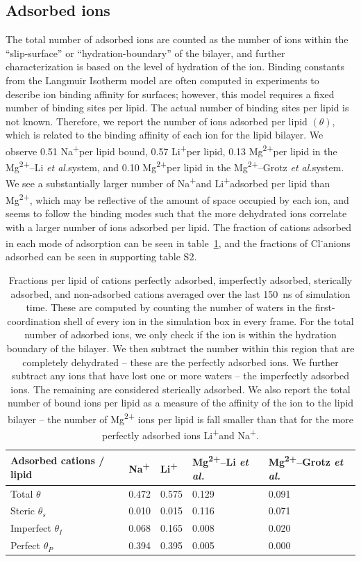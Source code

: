 \documentclass[12pt,openany,final]{book}
\newcommand{\etal}{\textit{et al.}}
\newcommand{\na}{Na\textsuperscript{+}}
\newcommand{\li}{Li\textsuperscript{+}}
\newcommand{\mg}{Mg\textsuperscript{2+}}
\newcommand{\cl}{Cl\textsuperscript{-}}
\newcommand{\mgmbnbfix}{Mg\textsuperscript{2+}--Li \etal} %
\newcommand{\mgmicro}{Mg\textsuperscript{2+}--Grotz \etal}
\begin{document}
\subsection{Adsorbed ions}
\label{sec:boundions}
The total number of adsorbed ions are counted as the number of ions within the ``slip-surface'' or ``hydration-boundary'' of the bilayer, and
further characterization is based on the level of hydration of the ion.
Binding constants from the Langmuir Isotherm model are often computed in experiments to describe ion binding affinity for
surfaces; however, this model requires a fixed number of binding sites per lipid. The actual number of binding sites
per lipid is not known. Therefore, we report the number of ions adsorbed per lipid $(\theta)$, which 
{is related to} 
the binding affinity of each ion for the lipid bilayer.
We observe 0.51 \na per lipid bound, 0.57 \li per lipid, 0.13 \mg per lipid in the \mgmbnbfix system, and 0.10 \mg per lipid
in the \mgmicro system. We see a substantially larger number of \na and \li adsorbed per lipid than
\mg, which may be reflective of the amount of space occupied by each ion, and seems to follow the
binding modes such that the more dehydrated ions correlate with a larger number of ions adsorbed per lipid.
The fraction of cations adsorbed in each mode of adsorption can be seen in table~\ref{tab:cationfrac:ch2}, and the fractions
of \cl anions adsorbed can be seen in {supporting table S2}.
\begin{table}
    \caption[Fractions of ions adsorbed per lipid]{Fractions per lipid of cations perfectly adsorbed, imperfectly adsorbed, sterically adsorbed, and non-adsorbed cations
        {averaged over the last 150~ns of simulation time}. These are computed
    by counting the number of waters in the first-coordination shell of every ion in the simulation box in every frame. For the total number
    of adsorbed ions, we
    only check if the ion is within the hydration boundary of the bilayer. We then subtract the number within this region that are
    completely dehydrated -- these are the perfectly adsorbed ions. We further subtract any ions that have lost 
    one or more waters -- the imperfectly adsorbed
    ions. The remaining are considered sterically adsorbed. 
    We also report the total number of bound ions per lipid as a measure 
    of the affinity of the ion to the lipid bilayer -- the number of \mg
    ions per lipid is fall smaller than that for the more perfectly adsorbed ions \li and Na\textsuperscript{+}.}
    \label{tab:cationfrac:ch2}
    \begin{tabularx}{\textwidth}{|X|X|X|X|X|}\hline
    Adsorbed cations / lipid & \na & \li & \mgmbnbfix   & \mgmicro \\\hline
    Total     $\theta$       &{0.472}&{0.575}&{0.129}&{0.091}     \\\hline
    Steric    $\theta_s$     &{0.010}&{0.015}&{0.116}&{0.071}     \\\hline
    Imperfect $\theta_I$     &{0.068}&{0.165}&{0.008}&{0.020}     \\\hline
    Perfect   $\theta_P$     &{0.394}&{0.395}&{0.005}&{0.000}     \\\hline
    \end{tabularx}
\end{table}
\end{document}
